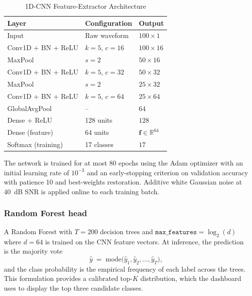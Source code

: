 \documentclass[conference]{IEEEtran}
\begin{document}
\begin{table}[!htbp]
  \centering
  \caption{1D-CNN Feature-Extractor Architecture}
  \label{tab:cnn}
  \footnotesize
  \setlength{\tabcolsep}{5pt}
  \renewcommand{\arraystretch}{1.2}
  \begin{tabular}{|l|l|l|}
    \hline
    Layer & Configuration & Output \\
    \hline
    Input              & Raw waveform           & $100\times1$ \\
    \hline
    Conv1D + BN + ReLU & $k\!=\!5$, $c\!=\!16$  & $100\times16$ \\
    \hline
    MaxPool            & $s\!=\!2$              & $50\times16$ \\
    \hline
    Conv1D + BN + ReLU & $k\!=\!5$, $c\!=\!32$  & $50\times32$ \\
    \hline
    MaxPool            & $s\!=\!2$              & $25\times32$ \\
    \hline
    Conv1D + BN + ReLU & $k\!=\!5$, $c\!=\!64$  & $25\times64$ \\
    \hline
    GlobalAvgPool      & --                     & $64$ \\
    \hline
    Dense + ReLU       & 128 units              & $128$ \\
    \hline
    Dense (feature)    & 64 units               & $\mathbf{f}\!\in\!\mathbb{R}^{64}$ \\
    \hline
    Softmax (training) & 17 classes             & $17$ \\
    \hline
  \end{tabular}
\end{table}

The network is trained for at most 80 epochs using the Adam
optimizer with an initial learning rate of $10^{-3}$ and an
early-stopping criterion on validation accuracy with patience 10
and best-weights restoration. Additive white Gaussian noise at
40~dB SNR is applied online to each training batch.

\subsubsection{Random Forest head}
A Random Forest with $T = 200$ decision trees and
$\mathtt{max\_features} = \log_{2}(d)$ where $d = 64$ is trained on
the CNN feature vectors. At inference, the prediction is the majority
vote
\begin{equation}
  \hat{y} \;=\;
  \mathrm{mode}\bigl(\hat{y}_1, \hat{y}_2, \ldots, \hat{y}_T\bigr),
  \label{eq:vote}
\end{equation}
and the class probability is the empirical frequency of each label
across the trees. This formulation provides a calibrated top-$K$
distribution, which the dashboard uses to display the top three
candidate classes.
\end{document}
